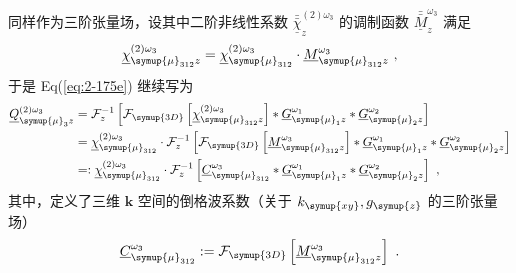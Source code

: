同样作为三阶张量场，设其中二阶非线性系数 $\bar{\bar{\underline{\chi}}}^{(2)\omega_3}_{z}$ 的调制函数 $\bar{\bar{\underline{M}}}^{\omega_3}_z$ 满足
\begin{equation} \label{eq:2-176}
	\abovedisplayskip=13pt
	\belowdisplayskip=13pt
	\underline{\chi}^{(2)\omega_3}_{{\symup{\mu}}_{312}z} = \underline{\chi}^{(2)\omega_3}_{{\symup{\mu}}_{312}} \cdot \underline{M}^{\omega_3}_{{\symup{\mu}}_{312}z} ~,
\end{equation}
于是 Eq(\ref{eq:2-175e}) 继续写为
\begin{subequations} \label{eq:2-177}
	\abovedisplayskip=13pt
	\belowdisplayskip=13pt
	\begin{align}
		\underline{Q}^{(2)\omega_3}_{{\symup{\mu}}_{3} z} &= \mathcal F^{-1}_{z} \left[ \mathcal F_{\symup{3D}} \left[ \underline{\chi}^{(2)\omega_3}_{{\symup{\mu}}_{312}z} \right] * \underline{G}^{\omega_1}_{{\symup{\mu}}_1 z} * \underline{G}^{\omega_2}_{{\symup{\mu}}_2 z} \right] \label{eq:2-177a} \\ &= \underline{\chi}^{(2)\omega_3}_{{\symup{\mu}}_{312}} \cdot \mathcal F^{-1}_{z} \left[ \mathcal F_{\symup{3D}} \left[ \underline{M}^{\omega_3}_{{\symup{\mu}}_{312}z} \right] * \underline{G}^{\omega_1}_{{\symup{\mu}}_1 z} * \underline{G}^{\omega_2}_{{\symup{\mu}}_2 z} \right] \label{eq:2-177b} \\ &=: \underline{\chi}^{(2)\omega_3}_{{\symup{\mu}}_{312}} \cdot \mathcal F^{-1}_{z} \left[ \underline{C}^{\omega_3}_{{\symup{\mu}}_{312}} * \underline{G}^{\omega_1}_{{\symup{\mu}}_1 z} * \underline{G}^{\omega_2}_{{\symup{\mu}}_2 z} \right] \label{eq:2-177c}~,
	\end{align}
\end{subequations}
其中，定义了三维 $\symbf{k}$ 空间的倒格波系数（关于 $k_{\symup{xy}}, g_{\symup{z}}$ 的三阶张量场）
\begin{equation} \label{eq:2-178}
	\abovedisplayskip=13pt
	\belowdisplayskip=13pt
	\underline{C}^{\omega_3}_{{\symup{\mu}}_{312}} := \mathcal F_{\symup{3D}} \left[ \underline{M}^{\omega_3}_{{\symup{\mu}}_{312}z} \right] ~.
\end{equation}

